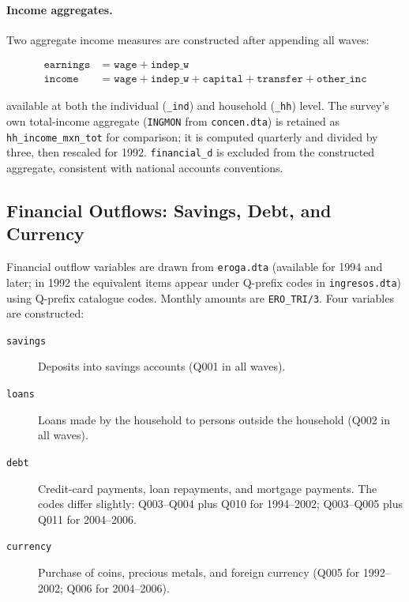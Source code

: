 \paragraph{Income aggregates.}
Two aggregate income measures are constructed after appending all waves:

\begin{align*}
\texttt{earnings} &= \texttt{wage} + \texttt{indep\_w} \\
\texttt{income}   &= \texttt{wage} + \texttt{indep\_w} + \texttt{capital}
                     + \texttt{transfer} + \texttt{other\_inc}
\end{align*}

available at both the individual (\texttt{\_ind}) and household (\texttt{\_hh})
level. The survey's own total-income aggregate (\texttt{INGMON} from
\texttt{concen.dta}) is retained as \texttt{hh\_income\_mxn\_tot} for
comparison; it is computed quarterly and divided by three, then rescaled for
1992. \texttt{financial\_d} is excluded from the constructed aggregate,
consistent with national accounts conventions.

\subsection{Financial Outflows: Savings, Debt, and Currency}
\label{app:enigh_savings}

Financial outflow variables are drawn from \texttt{eroga.dta} (available for
1994 and later; in 1992 the equivalent items appear under Q-prefix codes in
\texttt{ingresos.dta}) using Q-prefix catalogue codes. Monthly amounts are
\texttt{ERO\_TRI/3}. Four variables are constructed:

\begin{description}
  \item[\texttt{savings}] Deposits into savings accounts (Q001 in all waves).
  \item[\texttt{loans}] Loans made by the household to persons outside the
    household (Q002 in all waves).
  \item[\texttt{debt}] Credit-card payments, loan repayments, and mortgage
    payments. The codes differ slightly: Q003--Q004 plus Q010 for 1994--2002;
    Q003--Q005 plus Q011 for 2004--2006.
  \item[\texttt{currency}] Purchase of coins, precious metals, and foreign
    currency (Q005 for 1992--2002; Q006 for 2004--2006).
\end{description}

